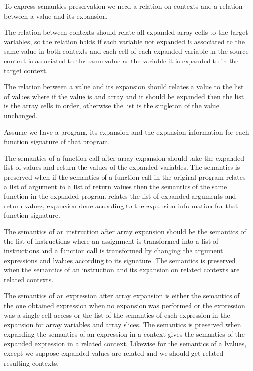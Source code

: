 \documentclass{article}
\begin{document}
To express semantics preservation we need a relation on contexts and a relation
between a value and its expansion.

The relation between contexts should relate all expanded array cells to the
target variables, so the relation holds if each variable not expanded is
associated to the same value in both contexts and each cell of each expanded
variable in the source context is associated to the same value as the variable
it is expanded to in the target context.

The relation between a value and its expansion should relates a value to the
list of values where if the value is and array and it should be expanded then
the list is the array cells in order, otherwise the list is the singleton of the
value unchanged.

\medskip

Assume we have a program, its expansion and the expansion information for each
function signature of that program.

The semantics of a function call after array expansion should take the expanded
list of values and return the values of the expanded variables. The semantics is
preserved when if the semantics of a function call in the original program
relates a list of argument to a list of return values then the semantics of the
same function in the expanded program relates the list of expanded arguments and
return values, expansion done according to the expansion information for that
function signature.

The semantics of an instruction after array expansion should be the semantics of
the list of instructions where an assignment is transformed into a list of
instructions and a function call is transformed by changing the argument
expressions and lvalues according to its signature. The semantics is
preserved when the semantics of an instruction and its expansion on related
contexts are related contexts.

\smallskip

The semantics of an expression after array expansion is either the semantics of
the one obtained expression when no expansion was performed or the expression
was a single cell access or the list of the semantics of each expression in the
expansion for array variables and array slices. The semantics is preserved when
expanding the semantics of an expression in a context gives the semantics of
the expanded expression in a related context. Likewise for the semantics of a
lvalues, except we suppose expanded values are related and we should get
related resulting contexts.
\end{document}
